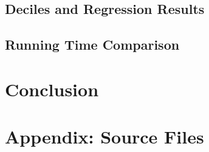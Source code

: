 \documentclass{article}
\begin{document}
\subsection{Deciles and Regression Results}

\subsection{Running Time Comparison}

\section{Conclusion}








\pagebreak
\section*{Appendix: Source Files}
%
%
%


\end{document}
